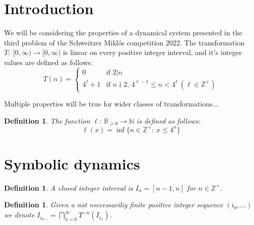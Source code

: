 \documentclass{article}
\newtheorem{defin}[theorem]{Definition}
\begin{document}
\section{Introduction}

We will be considering the properties of a dynamical system presented in the third problem of the Schweitzer Miklós competition 2022. The transformation $T:\: [ 0,\infty ) \rightarrow [0, \infty)$ is linear on every positive integer interval, and it's integer values are defined as follows:
\begin{equation}
T(n)=
	\begin{cases}
		0 & \text{if } 2|n\\
		4^{\ell}+1 & \text{if } n\nmid 2,\, 4^{\ell - 1}\leq n < 4^{\ell} \: (\ell \in \mathbb{Z}^+) 
	\end{cases}
\end{equation}

Multiple properties will be true for wider classes of transformations...

\begin{defin}
The function $\ell:\: \mathbb{R}_{\geq 0} \rightarrow \mathbb{N}$ is defined as follows:\[
\ell(x) = \inf\{n\in \mathbb{Z}^+:\: x \leq 4^n \}
\]
\end{defin}

\section{Symbolic dynamics}

\begin{defin}
A closed integer interval is $I_n = [n-1, n]$ for $n\in \mathbb{Z}^+$.
\end{defin}

\begin{defin} \label{symbolinterval}
Given a not neccessariliy finite positive integer sequence $(i_0,...)$ we denote $I_{i_0...} = \bigcap_{n=0}^{\infty} T^{-n}(I_{i_n})$.
\end{defin}
\end{document}
